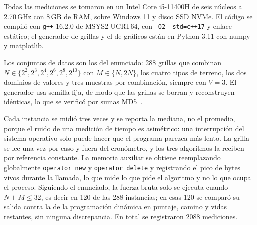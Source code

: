 Todas las mediciones se tomaron en un Intel Core i5-11400H de seis núcleos a
2.70\,GHz con 8\,GB de RAM, sobre Windows 11 y disco SSD NVMe. El código se
compiló con \texttt{g++} 16.2.0 de MSYS2 UCRT64, con \texttt{-O2 -std=c++17} y
enlace estático; el generador de grillas y el de gráficos están en Python 3.11
con numpy y matplotlib.

Los conjuntos de datos son los del enunciado: 288 grillas que combinan
$N \in \{2^2, 2^3, 2^4, 2^6, 2^8, 2^{10}\}$ con $M \in \{N, 2N\}$, los cuatro
tipos de terreno, los dos dominios de valores y tres muestras por combinación,
siempre con $V = 3$. El generador usa semilla fija, de modo que las grillas se
borran y reconstruyen idénticas, lo que se verificó por sumas
MD5~\cite{hales2017replicability}.

Cada instancia se midió tres veces y se reporta la mediana, no el promedio,
porque el ruido de una medición de tiempo es asimétrico: una interrupción del
sistema operativo solo puede hacer que el programa parezca más lento. La grilla
se lee una vez por caso y fuera del cronómetro, y los tres algoritmos la
reciben por referencia constante. La memoria auxiliar se obtiene reemplazando
globalmente \texttt{operator new} y \texttt{operator delete} y registrando el
pico de bytes vivos durante la llamada, lo que mide lo que pide el algoritmo y
no lo que ocupa el proceso. Siguiendo el enunciado, la fuerza bruta solo se
ejecuta cuando $N + M \leq 32$, es decir en 120 de las 288 instancias; en esas
120 se comparó su salida contra la de la programación dinámica en puntaje,
camino y vidas restantes, sin ninguna discrepancia. En total se registraron
2088 mediciones.
